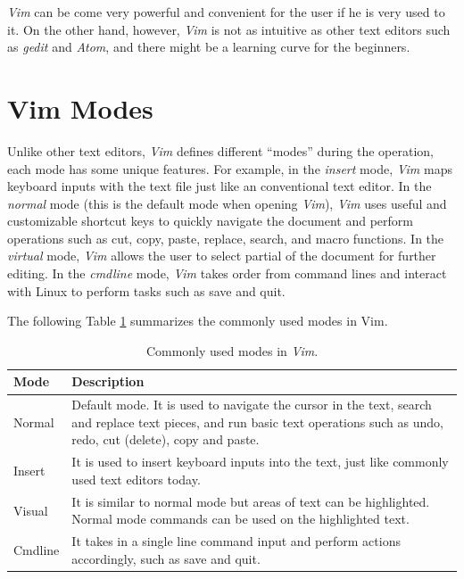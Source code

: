 \textit{Vim} can be come very powerful and convenient for the user if he is very used to it. On the other hand, however, \textit{Vim} is not as intuitive as other text editors such as \textit{gedit} and \textit{Atom}, and there might be a learning curve for the beginners.

\section{Vim Modes} \label{ch:tfe:subsec:vimgeneralintro}

Unlike other text editors, \textit{Vim} defines different ``modes'' during the operation, each mode has some unique features. For example, in the \textit{insert} mode, \textit{Vim} maps keyboard inputs with the text file just like an conventional text editor. In the \textit{normal} mode (this is the default mode when opening \textit{Vim}), \textit{Vim} uses useful and customizable shortcut keys to quickly navigate the document and perform operations such as cut, copy, paste, replace, search, and macro functions. In the \textit{virtual} mode, \textit{Vim} allows the user to select partial of the document for further editing. In the \textit{cmdline} mode, \textit{Vim} takes order from command lines and interact with Linux to perform tasks such as save and quit.

The following Table \ref{ch:tfe:tab:vimmodes} summarizes the commonly used modes in Vim.
\begin{table}
  \centering \caption{Commonly used modes in \textit{Vim}.}\label{ch:tfe:tab:vimmodes}
  \begin{tabularx}{\textwidth}{lX}
    \hline
    Mode & Description \\ \hline
    Normal & Default mode. It is used to navigate the cursor in the text, search and replace text pieces, and run basic text operations such as undo, redo, cut (delete), copy and paste. \\ \hdashline
    Insert & It is used to insert keyboard inputs into the text, just like commonly used text editors today. \\ \hdashline
    Visual & It is similar to normal mode but areas of text can be highlighted. Normal mode commands can be used on the highlighted text. \\ \hdashline
    Cmdline & It takes in a single line command input and perform actions accordingly, such as save and quit. \\
    \hline
  \end{tabularx}
\end{table}

